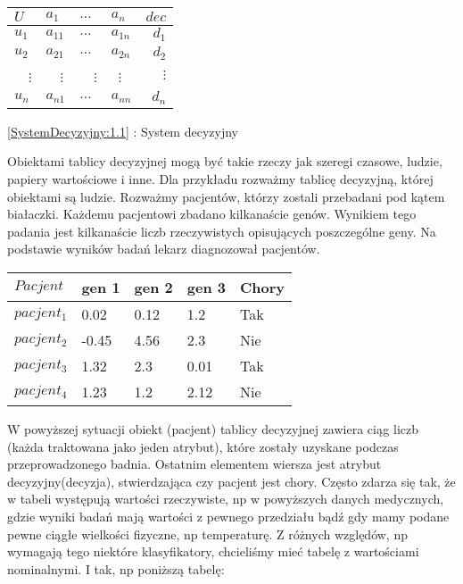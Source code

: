 \documentclass[magisterska]{pracamgr}
\theoremstyle{plain}
\theoremstyle{definition}
\theoremstyle{remark}
\begin{document}
\begin{center}
  \begin{tabular}{  l || l l l | r }
  \label{SystemDecyzyjny:1.1}
    $U$ & $a_1$ & $\ldots$ & $a_n$ & $dec$ \\ 
    \hline
  
    $u_1$ & $a_{11}$ & $\ldots $ & $a_{1n} $ & $d_{1}$ \\
    $u_2$ & $a_{21}$ & $\ldots $ & $a_{2n} $ & $d_{2}$ \\ 
    \ \ $\vdots$ & \ \ $\vdots$ & \ \ $\vdots$ & \   $\vdots$ & $\vdots$ \\ 
    $u_n$ & $a_{n1}$ & $\ldots $ & $a_{nn} $ & $d_{n}$ \\     
  \end{tabular}\par
  \bigskip 
  \ref{SystemDecyzyjny:1.1} : System decyzyjny

\end{center}

Obiektami tablicy decyzyjnej mogą być takie rzeczy jak szeregi czasowe, ludzie,
papiery wartościowe i inne. \newline Dla przykładu rozważmy tablicę decyzyjną,
której obiektami są ludzie. Rozważmy pacjentów, którzy zostali przebadani pod kątem białaczki.
Każdemu pacjentowi zbadano kilkanaście genów. Wynikiem tego padania jest kilkanaście 
liczb rzeczywistych opisujących poszczególne geny. Na podstawie wyników badań lekarz diagnozował pacjentów.
\newline
\begin{center}
 \begin{tabular}{l || P{2.5cm} P{2.5cm} P{2.5cm} | P{1.5cm}}
  $Pacjent$     & gen 1 & gen 2 & gen 3 & Chory \\ 
  \hline
  $pacjent_{1}$ & 0.02       & 0.12       & 1.2    & Tak \\
  $pacjent_{2}$ & -0.45      & 4.56       & 2.3    & Nie \\
  $pacjent_{3}$ & 1.32       & 2.3        & 0.01   & Tak \\
  $pacjent_{4}$ & 1.23       & 1.2        & 2.12   & Nie \\
 \end{tabular}
\end{center}
W powyższej sytuacji obiekt (pacjent) tablicy decyzyjnej zawiera ciąg liczb (każda traktowana jako
jeden atrybut), które zostały uzyskane podczas przeprowadzonego badnia. Ostatnim elementem wiersza
jest atrybut decyzyjny(decyzja), stwierdzająca czy pacjent jest chory.
\newline
Często zdarza się tak, że w tabeli występują wartości rzeczywiste, np w powyższych danych medycznych, gdzie 
wyniki badań mają wartości z pewnego przedziału bądź gdy mamy podane pewne ciągłe wielkości fizyczne, np
temperaturę. Z różnych względów, np wymagają tego niektóre klasyfikatory, chcieliśmy mieć tabelę z wartościami
nominalnymi. I tak, np poniższą tabelę:
\end{document}
